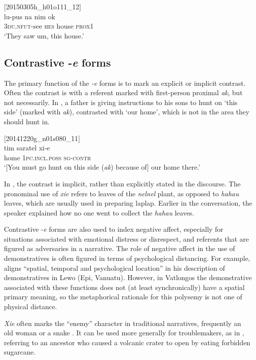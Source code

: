 \documentclass[output=paper,colorlinks,citecolor=brown]{langscibook}
\begin{document}
\ea
{\label{ex:ridge:43}[20150305h\_h01o111\_12]}\\
\gll lu-pus    na  nim  ok\\
     \textsc{3du.nfut-}see  \textsc{hes}  house  \textsc{prox1}\\
\glt ‘They saw um, this house.’
\z


\subsection{Contrastive -\textit{e} forms}
\label{sec:ridge:4.3}

The primary function of the \textit{-e} forms is to mark an explicit or implicit contrast. Often the contrast is with a referent marked with first-person proximal \textit{ak}, but not necessarily. In , a father is giving instructions to his sons to hunt on ‘this side’ (marked with \textit{ak}), contrasted with ‘our home’, which is not in the area they should hunt in.

\ea
{\label{ex:ridge:44}[20141220g\_n01s080\_11]}\\
\gll tim  saratel    xi-e\\
     home  \textsc{1pc.incl.poss} \textsc{sg-contr}\\
\glt ‘[You must go hunt on this side (\textit{ak}) because of] our home there.’
\z

In , the contrast is implicit, rather than explicitly stated in the discourse. The pronominal use of \textit{xie} refers to leaves of the \textit{nelnel} plant, as opposed to \textit{hahau} leaves, which are usually used in preparing laplap. Earlier in the conversation, the speaker explained how no one went to collect the \textit{hahau} leaves.

Contrastive -\textit{e} forms are also used to index negative affect, especially for situations associated with emotional distress or disrespect, and referents that are figured as adversaries in a narrative. The role of negative affect in the use of demonstratives is often figured in terms of psychological distancing. For example, \citet[225]{Early1994} aligns “spatial, temporal and psychological location” in his description of demonstratives in Lewo (Epi, Vanuatu). However, in Vatlongos the demonstrative associated with these functions does not (at least synchronically) have a spatial primary meaning, so the metaphorical rationale for this polysemy is not one of physical distance.

\textit{Xie} often marks the “enemy” character in traditional narratives, frequently an old woman  or a snake . It can be used more generally for troublemakers, as in , referring to an ancestor who caused a volcanic crater to open by eating forbidden sugarcane.
\end{document}
